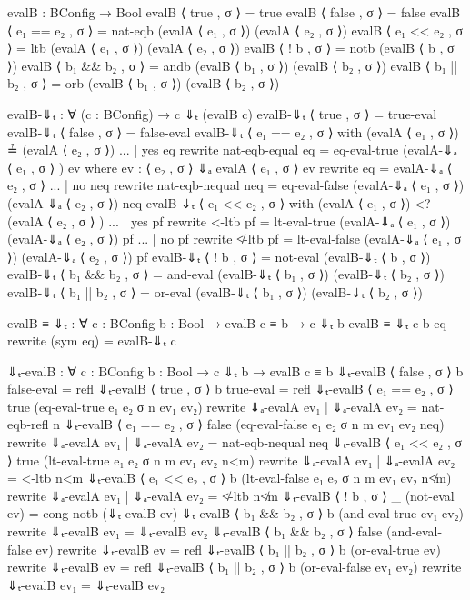 \documentclass{lecturenotes}
\begin{document}
\begin{code}[hide]
evalB : BConfig → Bool
evalB ⟨ true , σ ⟩ = true
evalB ⟨ false , σ ⟩ = false
evalB ⟨ e₁ == e₂ , σ ⟩ = nat-eqb (evalA ⟨ e₁ , σ ⟩) (evalA ⟨ e₂ , σ ⟩)
evalB ⟨ e₁ << e₂ , σ ⟩ = ltb (evalA ⟨ e₁ , σ ⟩) (evalA ⟨ e₂ , σ ⟩)
evalB ⟨ ! b , σ ⟩ = notb (evalB ⟨ b , σ ⟩)
evalB ⟨ b₁ && b₂ , σ ⟩ = andb (evalB ⟨ b₁ , σ ⟩) (evalB ⟨ b₂ , σ ⟩)
evalB ⟨ b₁ || b₂ , σ ⟩ = orb (evalB ⟨ b₁ , σ ⟩) (evalB ⟨ b₂ , σ ⟩)


evalB-⇓ₜ : ∀ (c : BConfig) → c ⇓ₜ (evalB c)
evalB-⇓ₜ ⟨ true , σ ⟩ = true-eval
evalB-⇓ₜ ⟨ false , σ ⟩ = false-eval
evalB-⇓ₜ ⟨ e₁ == e₂ , σ ⟩ with (evalA ⟨ e₁ , σ ⟩) ≟ (evalA ⟨ e₂ , σ ⟩)
... | yes eq rewrite nat-eqb-equal eq = eq-eval-true (evalA-⇓ₐ ⟨ e₁ , σ ⟩ ) ev
    where
      ev : ⟨ e₂ , σ ⟩ ⇓ₐ evalA ⟨ e₁ , σ ⟩
      ev rewrite eq = evalA-⇓ₐ ⟨ e₂ , σ ⟩
... | no neq rewrite nat-eqb-nequal neq = eq-eval-false (evalA-⇓ₐ ⟨ e₁ , σ ⟩) (evalA-⇓ₐ ⟨ e₂ , σ ⟩) neq
evalB-⇓ₜ ⟨ e₁ << e₂ , σ ⟩ with (evalA ⟨ e₁ , σ ⟩) <? (evalA ⟨ e₂ , σ ⟩ )
... | yes pf rewrite <-ltb pf = lt-eval-true (evalA-⇓ₐ ⟨ e₁ , σ ⟩) (evalA-⇓ₐ ⟨ e₂ , σ ⟩) pf
... | no pf rewrite ≮-ltb pf = lt-eval-false (evalA-⇓ₐ ⟨ e₁ , σ ⟩) (evalA-⇓ₐ ⟨ e₂ , σ ⟩) pf 
evalB-⇓ₜ ⟨ ! b , σ ⟩ = not-eval (evalB-⇓ₜ ⟨ b , σ ⟩) 
evalB-⇓ₜ ⟨ b₁ && b₂ , σ ⟩ = and-eval (evalB-⇓ₜ ⟨ b₁ , σ ⟩) (evalB-⇓ₜ ⟨ b₂ , σ ⟩) 
evalB-⇓ₜ ⟨ b₁ || b₂ , σ ⟩ = or-eval (evalB-⇓ₜ ⟨ b₁ , σ ⟩) (evalB-⇓ₜ ⟨ b₂ , σ ⟩)

evalB-≡-⇓ₜ : ∀ {c : BConfig} {b : Bool} → evalB c ≡ b → c ⇓ₜ b
evalB-≡-⇓ₜ {c} {b} eq rewrite (sym eq) = evalB-⇓ₜ c 

⇓ₜ-evalB : ∀ {c : BConfig} {b : Bool} → c ⇓ₜ b → evalB c ≡ b
⇓ₜ-evalB {⟨ false , σ ⟩} {b} false-eval = refl
⇓ₜ-evalB {⟨ true , σ ⟩} {b} true-eval = refl
⇓ₜ-evalB {⟨ e₁ == e₂ , σ ⟩} {true} (eq-eval-true {e₁} {e₂} {σ} {n} ev₁ ev₂) rewrite ⇓ₐ-evalA ev₁ | ⇓ₐ-evalA ev₂ = nat-eqb-refl {n}
⇓ₜ-evalB {⟨ e₁ == e₂ , σ ⟩} {false} (eq-eval-false {e₁} {e₂} {σ} {n} {m} ev₁ ev₂ neq) rewrite ⇓ₐ-evalA ev₁ | ⇓ₐ-evalA ev₂ = nat-eqb-nequal neq
⇓ₜ-evalB {⟨ e₁ << e₂ , σ ⟩} {true} (lt-eval-true {e₁} {e₂} {σ} {n} {m} ev₁ ev₂ n<m) rewrite ⇓ₐ-evalA ev₁ | ⇓ₐ-evalA ev₂ = <-ltb n<m
⇓ₜ-evalB {⟨ e₁ << e₂ , σ ⟩} {b} (lt-eval-false {e₁} {e₂} {σ} {n} {m} ev₁ ev₂ n≮m) rewrite ⇓ₐ-evalA ev₁ | ⇓ₐ-evalA ev₂ = ≮-ltb n≮m
⇓ₜ-evalB {⟨ ! b , σ ⟩ } {_} (not-eval ev) = cong notb (⇓ₜ-evalB ev)
⇓ₜ-evalB {⟨ b₁ && b₂ , σ ⟩} {b} (and-eval-true ev₁ ev₂) rewrite ⇓ₜ-evalB ev₁ = ⇓ₜ-evalB ev₂
⇓ₜ-evalB {⟨ b₁ && b₂ , σ ⟩} {false} (and-eval-false ev) rewrite ⇓ₜ-evalB ev = refl
⇓ₜ-evalB {⟨ b₁ || b₂ , σ ⟩} {b} (or-eval-true ev) rewrite ⇓ₜ-evalB ev = refl
⇓ₜ-evalB {⟨ b₁ || b₂ , σ ⟩} {b} (or-eval-false ev₁ ev₂) rewrite ⇓ₜ-evalB ev₁ = ⇓ₜ-evalB ev₂
\end{code}
\end{document}
